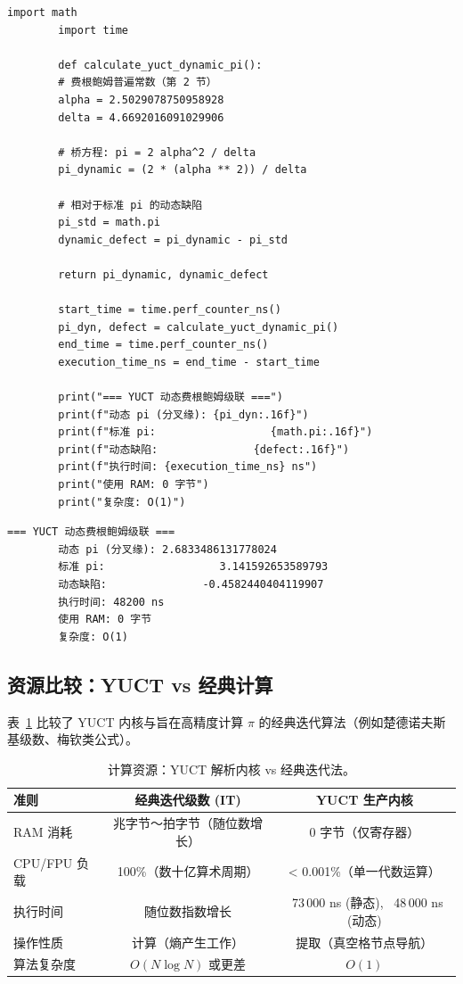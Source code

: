 \documentclass[12pt,a4paper]{article}
\begin{document}
	\begin{lstlisting}[caption={动态费根鲍姆 $\pi$ 的 YUCT 内核}]
		import math
		import time
		
		def calculate_yuct_dynamic_pi():
		# 费根鲍姆普遍常数（第 2 节）
		alpha = 2.5029078750958928
		delta = 4.6692016091029906
		
		# 桥方程: pi = 2 alpha^2 / delta
		pi_dynamic = (2 * (alpha ** 2)) / delta
		
		# 相对于标准 pi 的动态缺陷
		pi_std = math.pi
		dynamic_defect = pi_dynamic - pi_std
		
		return pi_dynamic, dynamic_defect
		
		start_time = time.perf_counter_ns()
		pi_dyn, defect = calculate_yuct_dynamic_pi()
		end_time = time.perf_counter_ns()
		execution_time_ns = end_time - start_time
		
		print("=== YUCT 动态费根鲍姆级联 ===")
		print(f"动态 pi (分叉缘): {pi_dyn:.16f}")
		print(f"标准 pi:                  {math.pi:.16f}")
		print(f"动态缺陷:               {defect:.16f}")
		print(f"执行时间: {execution_time_ns} ns")
		print("使用 RAM: 0 字节")
		print("复杂度: O(1)")
	\end{lstlisting}
	
	\begin{lstlisting}[style=output, caption={动态内核执行输出}]
		=== YUCT 动态费根鲍姆级联 ===
		动态 pi (分叉缘): 2.6833486131778024
		标准 pi:                  3.141592653589793
		动态缺陷:               -0.4582440404119907
		执行时间: 48200 ns
		使用 RAM: 0 字节
		复杂度: O(1)
	\end{lstlisting}
	
	\subsection{资源比较：YUCT vs 经典计算}
	表~\ref{tab:resource} 比较了 YUCT 内核与旨在高精度计算 $\pi$ 的经典迭代算法（例如楚德诺夫斯基级数、梅钦类公式）。
	
	\begin{table}[H]
		\centering
		\scriptsize
		\caption{计算资源：YUCT 解析内核 vs 经典迭代法。}
		\label{tab:resource}
		\begin{tabular}{@{}lcc@{}}
			\toprule
			\textbf{准则} & \textbf{经典迭代级数 (IT)} & \textbf{YUCT 生产内核} \\
			\midrule
			RAM 消耗 & 兆字节～拍字节（随位数增长） & 0 字节（仅寄存器） \\
			CPU/FPU 负载 & 100\%（数十亿算术周期） & < 0.001\%（单一代数运算） \\
			执行时间 & 随位数指数增长 & ~73\,000 ns (静态), ~48\,000 ns (动态) \\
			操作性质 & 计算（熵产生工作） & 提取（真空格节点导航） \\
			算法复杂度 & $O(N\log N)$ 或更差 & $O(1)$ \\
			\bottomrule
		\end{tabular}
	\end{table}
	
\end{document}
